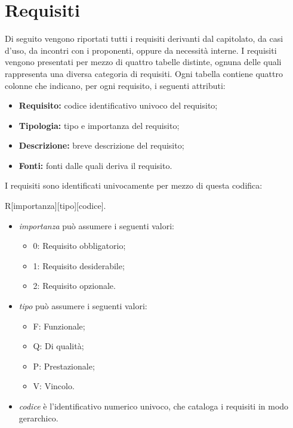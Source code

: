 \section{Requisiti}
\label{requisiti}
Di seguito vengono riportati tutti i requisiti derivanti dal capitolato, da casi d'uso\glossario{}, da incontri con i proponenti, oppure da necessità interne. I requisiti vengono presentati per mezzo di quattro tabelle distinte, ognuna delle quali rappresenta una diversa categoria di requisiti. Ogni tabella contiene quattro colonne che indicano, per ogni requisito, i seguenti attributi:
\begin{itemize}
\item \textbf{Requisito:} codice identificativo univoco del requisito;
\item \textbf{Tipologia:} tipo e importanza del requisito;
\item \textbf{Descrizione:} breve descrizione del requisito;
\item \textbf{Fonti:} fonti dalle quali deriva il requisito.
\end{itemize}

I requisiti sono identificati univocamente per mezzo di questa codifica:

\begin{center}
R[importanza][tipo][codice].
\end{center}
\begin{itemize}
\item \textit{importanza} può assumere i seguenti valori:
	
\begin{itemize}
\item 0: Requisito obbligatorio;
\item 1: Requisito desiderabile; 
\item 2: Requisito opzionale.
\end{itemize}

\item \textit{tipo} può assumere i seguenti valori:

\begin{itemize}
\item F: Funzionale;
\item Q: Di qualità;
\item P: Prestazionale;
\item V: Vincolo.
\end{itemize}

\item \textit{codice} è l'identificativo numerico univoco, che cataloga i requisiti in modo gerarchico.
\end{itemize}






